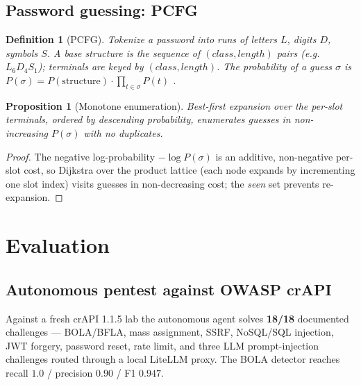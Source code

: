 \documentclass[journal]{IEEEtran}
\newtheorem{definition}{Definition}
\newtheorem{proposition}{Proposition}
\begin{document}
\subsection{Password guessing: PCFG}
\begin{definition}[PCFG]
\label{def:pcfg}
Tokenize a password into runs of letters $L$, digits $D$, symbols $S$. A
\emph{base structure} is the sequence of $(class,length)$ pairs (e.g.\
$L_6D_4S_1$); terminals are keyed by $(class,length)$. The probability of a guess
$\sigma$ is
$P(\sigma)=P(\mathrm{structure})\cdot\prod_{t\in\sigma}P(t)$
\cite{weir2009}.
\end{definition}
\begin{proposition}[Monotone enumeration]
\label{prop:pcfg}
Best-first expansion over the per-slot terminals, ordered by descending
probability, enumerates guesses in non-increasing $P(\sigma)$ with no duplicates.
\end{proposition}
\begin{proof}
The negative log-probability $-\log P(\sigma)$ is an additive, non-negative
per-slot cost, so Dijkstra over the product lattice (each node expands by
incrementing one slot index) visits guesses in non-decreasing cost; the
\emph{seen} set prevents re-expansion. \qedhere
\end{proof}

\section{Evaluation}
\label{sec:eval}

\subsection{Autonomous pentest against OWASP crAPI}
Against a fresh crAPI 1.1.5 lab the autonomous agent solves \textbf{18/18}
documented challenges --- BOLA/BFLA, mass assignment, SSRF, NoSQL/SQL injection,
JWT forgery, password reset, rate limit, and three LLM prompt-injection
challenges routed through a local LiteLLM proxy. The BOLA detector reaches recall
$1.0$ / precision $0.90$ / F1 $0.947$.
\end{document}
